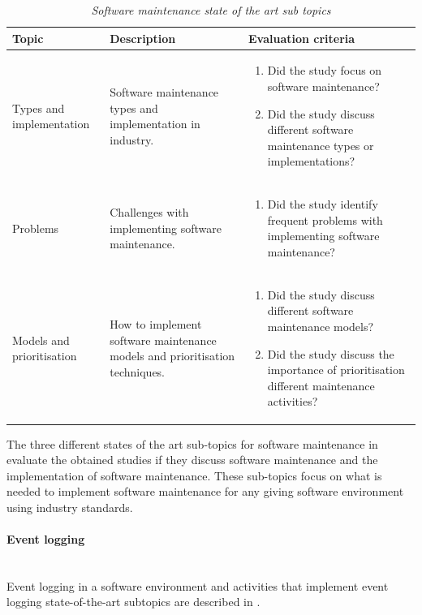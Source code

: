 \begin{table}[!htb]
	\centering
	\caption[Software maintenance state of the art sub topics]
	{\textit{Software maintenance state of the art sub topics}}
	\label{tbl:ch1_soaSoftwareMaintennace}
	\begin{tabularx}{\linewidth}{|l|X|X|}
		\hline \textbf{Topic}  & \textbf{Description} & \textbf{Evaluation criteria}\\
		\hline Types and implementation & \RaggedRight Software maintenance types and implementation in industry. & \RaggedRight \begin{enumerate}
			\item Did the study focus on software maintenance?
			\item Did the study discuss different software maintenance types or implementations?
		\end{enumerate} \\
		\hline Problems & Challenges with implementing software maintenance. & \RaggedRight \begin{enumerate}
			\item Did the study identify frequent problems with implementing software maintenance?
		\end{enumerate}\\
		\hline Models and prioritisation & How to implement software maintenance models and prioritisation techniques. & \RaggedRight \begin{enumerate}
			\item Did the study discuss different software maintenance models?
			\item Did the study discuss the importance of prioritisation different maintenance activities?
		\end{enumerate} \\
		\hline
	\end{tabularx}
\end{table}

\clearpage

The three different states of the art sub-topics for software maintenance in  evaluate the obtained studies if they discuss software maintenance and the implementation of software maintenance. These sub-topics focus on what is needed to implement software maintenance for any giving software environment using industry standards.

\paragraph{Event logging} \leavevmode\\
Event logging in a software environment and activities that implement event logging state-of-the-art subtopics are described in .

